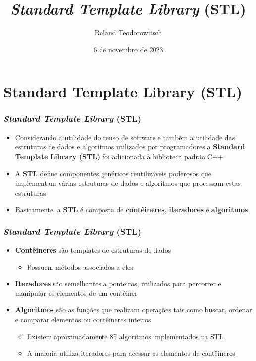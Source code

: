 \documentclass[xcolor={dvipsnames,table},aspectratio=169]{beamer}
\title[\sc{STL}]{\emph{Standard Template Library} (STL)}
\author[Roland Teodorowitsch]{Roland Teodorowitsch}
\institute[POO - EC - PUCRS]{Programação Orientada a Objetos - ECo - Curso de Engenharia de Computação - PUCRS}
\date{6 de novembro de 2023}
\begin{document}
\justifying

\begin{frame}
	\titlepage
\end{frame}

\section{Standard Template Library (STL)}

\begin{frame}\frametitle{\emph{Standard Template Library} (STL)}
\begin{itemize}
	\item Considerando a utilidade do reuso de software e também a utilidade das estruturas de dados e algoritmos utilizados por programadores a \textbf{Standard Template Library (STL)} foi adicionada à biblioteca padrão C++
	\item A \textbf{STL} define componentes genéricos reutilizáveis poderosos que implementam várias estruturas de dados e algoritmos que processam estas estruturas
	\item Basicamente, a \textbf{STL} é composta de \textbf{contêineres}, \textbf{iteradores} e \textbf{algoritmos}
\end{itemize}
\end{frame}

\begin{frame}\frametitle{\emph{Standard Template Library} (STL)}
\begin{itemize}
	\item \textbf{Contêineres} são templates de estruturas de dados
	\begin{itemize}
		\item Possuem métodos associados a eles
	\end{itemize}
	\item \textbf{Iteradores} são semelhantes a ponteiros, utilizados para percorrer e manipular os elementos de um contêiner
	\item \textbf{Algoritmos} são as funções que realizam operações tais como buscar, ordenar e comparar elementos ou contêineres inteiros
	\begin{itemize}
		\item Existem aproximadamente 85 algoritmos implementados na STL
		\item A maioria utiliza iteradores para acessar os elementos de contêineres
	\end{itemize}

\end{itemize}
\end{frame}
\end{document}
